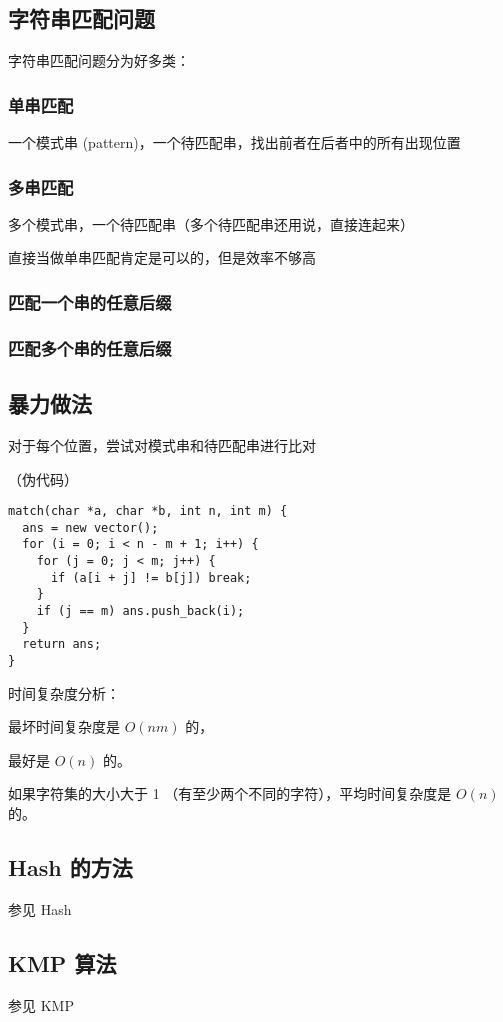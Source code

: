 
\subsection{字符串匹配问题}

字符串匹配问题分为好多类：

\subsubsection{单串匹配}

一个模式串 (pattern)，一个待匹配串，找出前者在后者中的所有出现位置

\subsubsection{多串匹配}

多个模式串，一个待匹配串（多个待匹配串还用说，直接连起来）

直接当做单串匹配肯定是可以的，但是效率不够高

\subsubsection{匹配一个串的任意后缀}

\subsubsection{匹配多个串的任意后缀}

\subsection{暴力做法}

对于每个位置，尝试对模式串和待匹配串进行比对

（伪代码）

\begin{verbatim}
match(char *a, char *b, int n, int m) {
  ans = new vector();
  for (i = 0; i < n - m + 1; i++) {
    for (j = 0; j < m; j++) {
      if (a[i + j] != b[j]) break;
    }
    if (j == m) ans.push_back(i);
  }
  return ans;
}
\end{verbatim}

时间复杂度分析：

最坏时间复杂度是 $O(nm)$ 的，

最好是 $O(n)$ 的。

如果字符集的大小大于 1 （有至少两个不同的字符），平均时间复杂度是 $O(n)$ 的。

\subsection{Hash 的方法}

参见  Hash 

\subsection{KMP 算法}

参见  KMP 
